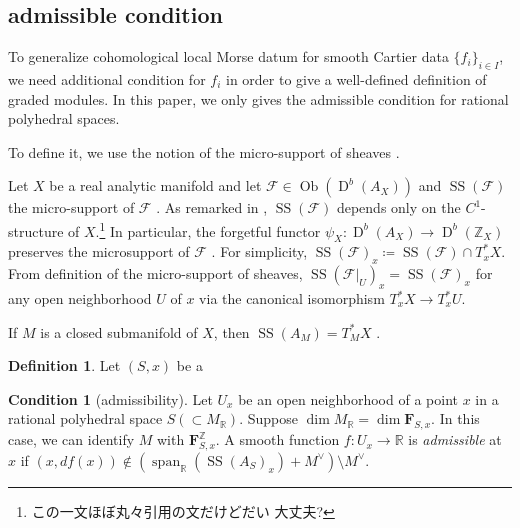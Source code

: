 \documentclass[a4paper,dvipdfmx,reqno,12pt]{amsart}
\theoremstyle{definition}
\newtheorem{Def}[Thm]{Definition}
\newtheorem{Rmk}[Thm]{Remark}
\newtheorem{Cond}[Thm]{Condition}
\newcommand{\deq}{\coloneqq}
\newcommand{\R}{\mathbb{R}}%
\newcommand{\Z}{\mathbb{Z}}%
\newcommand{\mcal}[1]{\mathcal{#1}}%
\newcommand{\opn}[1]{\operatorname{#1}}
\numberwithin{equation}{section}
\begin{document}
\subsection{admissible condition}

To generalize cohomological local Morse datum for
smooth Cartier data $\{f_i\}_{i\in I}$, we
need additional condition for $f_i$ in order 
to give a well-defined definition of graded modules.
In this paper, we only gives the admissible condition for 
rational polyhedral spaces.

To define it, we use the notion of the micro-support of
sheaves \cite[Chapter V]{MR1299726}.

Let $X$ be a real analytic manifold and let
$\mcal{F}\in\opn{Ob}(\opn{D}^{b}(A_X))$ and
$\opn{SS}(\mcal{F})$ the micro-support of $\mcal{F}$
\cite[Definition 5.1.2]{MR1299726}.
As remarked in \cite[Remark 5.1.6]{MR1299726},
$\opn{SS}(\mcal{F})$ depends only on the 
$C^{1}$-structure of $X$.\footnote{この一文ほぼ丸々引用の文だけどだい
大丈夫?}
In particular, 
the forgetful functor 
$\psi_X \colon \opn{D}^{b}(A_X)\to \opn{D}^{b}(\Z_X)$
preserves the microsupport of $\mcal{F}$ 
\cite[Remark 5.1.5]{MR1299726}.
For simplicity,
$\opn{SS}(\mcal{F})_x\deq \opn{SS}(\mcal{F}) \cap T^{*}_x X$.
From definition of the micro-support of sheaves, 
$\opn{SS}(\mcal{F}|_{U})_x=\opn{SS}(\mcal{F})_x$
for any open neighborhood $U$ of $x$ via the canonical 
isomorphism $T^{*}_xX\to T^{*}_xU$.

If $M$ is a closed submanifold of $X$, then
$\opn{SS}(A_M)=T^{*}_M X$ \cite[Proposition 5.3.2]{MR1299726}.

\begin{Def}
Let $(S,x)$ be a 
\end{Def}

\begin{Cond}[{admissibility}] \label{cond: admissible}
Let $U_x$ be an open neighborhood of a point $x$ in a rational polyhedral
space $S (\subset M_{\R})$. 
Suppose $\dim M_{\R}=\dim \mathbf{F}_{S,x}$. In this case,
we can identify $M$ with $\mathbf{F}_{S,x}^{\Z}$.
A smooth function $f\colon U_x \to \R$ is \emph{admissible} at $x$ 
if $(x,df(x))\notin (\opn{span}_{\R}(\opn{SS}(A_S)_x)+M^{\vee})\setminus M^{\vee}$.
\end{Cond}

\end{document}
